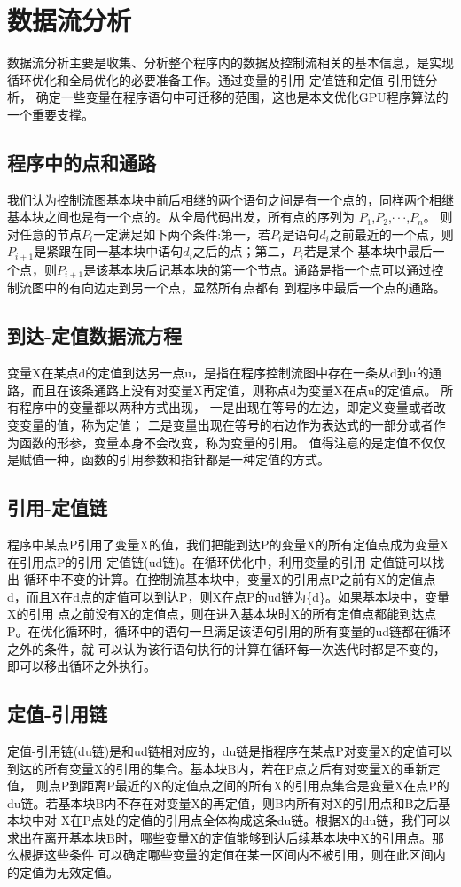 \section{数据流分析}
数据流分析主要是收集、分析整个程序内的数据及控制流相关的基本信息，是实现循环优化和全局优化的必要准备工作。通过变量的引用-定值链和定值-引用链分析，
确定一些变量在程序语句中可迁移的范围，这也是本文优化GPU程序算法的一个重要支撑。
\subsection{程序中的点和通路}
我们认为控制流图基本块中前后相继的两个语句之间是有一个点的，同样两个相继基本块之间也是有一个点的。从全局代码出发，所有点的序列为
$P_1$,$P_2$,$\cdot\cdot\cdot$,$P_n$。
则对任意的节点$P_i$一定满足如下两个条件:第一，若$P_i$是语句$d_i$之前最近的一个点，则$P_{i+1}$是紧跟在同一基本块中语句$d_i$之后的点；第二，$P_i$若是某个
基本块中最后一个点，则$P_{i+1}$是该基本块后记基本块的第一个节点。通路是指一个点可以通过控制流图中的有向边走到另一个点，显然所有点都有
到程序中最后一个点的通路。
\subsection{到达-定值数据流方程}
变量X在某点d的定值到达另一点u，是指在程序控制流图中存在一条从d到u的通路，而且在该条通路上没有对变量X再定值，则称点d为变量X在点u的定值点。
所有程序中的变量都以两种方式出现，
一是出现在等号的左边，即定义变量或者改变变量的值，称为定值；
二是变量出现在等号的右边作为表达式的一部分或者作为函数的形参，变量本身不会改变，称为变量的引用。
值得注意的是定值不仅仅是赋值一种，函数的引用参数和指针都是一种定值的方式。

\subsection{引用-定值链}
程序中某点P引用了变量X的值，我们把能到达P的变量X的所有定值点成为变量X在引用点P的引用-定值链(ud链)。在循环优化中，利用变量的引用-定值链可以找出
循环中不变的计算。在控制流基本块中，变量X的引用点P之前有X的定值点d，而且X在d点的定值可以到达P，则X在点P的ud链为\{d\}。如果基本块中，变量X的引用
点之前没有X的定值点，则在进入基本块时X的所有定值点都能到达点P。在优化循环时，循环中的语句一旦满足该语句引用的所有变量的ud链都在循环之外的条件，就
可以认为该行语句执行的计算在循环每一次迭代时都是不变的，即可以移出循环之外执行。

\subsection{定值-引用链}
定值-引用链(du链)是和ud链相对应的，du链是指程序在某点P对变量X的定值可以到达的所有变量X的引用的集合。基本块B内，若在P点之后有对变量X的重新定值，
则点P到距离P最近的X的定值点之间的所有X的引用点集合是变量X在点P的du链。若基本块B内不存在对变量X的再定值，则B内所有对X的引用点和B之后基本块中对
X在P点处的定值的引用点全体构成这条du链。根据X的du链，我们可以求出在离开基本块B时，哪些变量X的定值能够到达后续基本块中X的引用点。那么根据这些条件
可以确定哪些变量的定值在某一区间内不被引用，则在此区间内的定值为无效定值。









